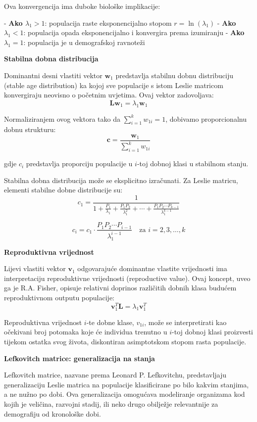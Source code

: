 \documentclass[11pt,oneside]{book}
\begin{document}
Ova konvergencija ima duboke biološke implikacije:

- \textbf{Ako $\lambda_1 > 1$}: populacija raste eksponencijalno stopom $r = \ln(\lambda_1)$
- \textbf{Ako $\lambda_1 < 1$}: populacija opada eksponencijalno i konvergira prema izumiranju
- \textbf{Ako $\lambda_1 = 1$}: populacija je u demografskoj ravnoteži

\textbf{Stabilna dobna distribucija}

Dominantni desni vlastiti vektor $\mathbf{w}_1$ predstavlja stabilnu dobnu distribuciju (stable age distribution) ka kojoj sve populacije s istom Leslie matricom konvergiraju neovisno o početnim uvjetima. Ovaj vektor zadovoljava:
$$\mathbf{L}\mathbf{w}_1 = \lambda_1 \mathbf{w}_1$$

Normaliziranjem ovog vektora tako da $\sum_{i=1}^k w_{1i} = 1$, dobivamo proporcionalnu dobnu strukturu:
$$\mathbf{c} = \frac{\mathbf{w}_1}{\sum_{i=1}^k w_{1i}}$$

gdje $c_i$ predstavlja proporciju populacije u $i$-toj dobnoj klasi u stabilnom stanju.

Stabilna dobna distribucija može se eksplicitno izračunati. Za Leslie matricu, elementi stabilne dobne distribucije su:
$$c_1 = \frac{1}{1 + \frac{P_1}{\lambda_1} + \frac{P_1P_2}{\lambda_1^2} + \cdots + \frac{P_1P_2\cdots P_{k-1}}{\lambda_1^{k-1}}}$$

$$c_i = c_1 \cdot \frac{P_1P_2\cdots P_{i-1}}{\lambda_1^{i-1}} \quad \text{za } i = 2, 3, \ldots, k$$

\textbf{Reproduktivna vrijednost}

Lijevi vlastiti vektor $\mathbf{v}_1$ odgovarajuće dominantne vlastite vrijednosti ima interpretaciju reproduktivne vrijednosti (reproductive value). Ovaj koncept, uveo ga je R.A. Fisher, opisuje relativni doprinos različitih dobnih klasa budućem reproduktivnom outputu populacije:
$$\mathbf{v}_1^T \mathbf{L} = \lambda_1 \mathbf{v}_1^T$$

Reproduktivna vrijednost $i$-te dobne klase, $v_{1i}$, može se interpretirati kao očekivani broj potomaka koje će individua trenutno u $i$-toj dobnoj klasi proizvesti tijekom ostatka svog života, diskontiran asimptotskom stopom rasta populacije.

\textbf{Lefkovitch matrice: generalizacija na stanja}

Lefkovitch matrice, nazvane prema Leonard P. Lefkovitchu, predstavljaju generalizaciju Leslie matrica na populacije klasificirane po bilo kakvim stanjima, a ne nužno po dobi. Ova generalizacija omogućava modeliranje organizama kod kojih je veličina, razvojni stadij, ili neko drugo obilježje relevantnije za demografiju od kronološke dobi.
\end{document}
